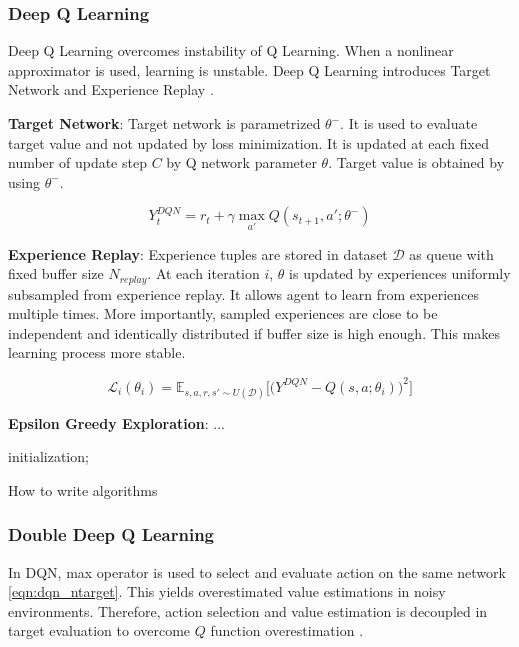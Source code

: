 \subsubsection{Deep Q Learning}

Deep Q Learning overcomes instability of Q Learning. When a nonlinear approximator is used, learning is unstable. Deep Q Learning introduces Target Network and Experience Replay \cite{mnih_human-level_2015}.

\textbf{Target Network}: Target network is parametrized $\theta^-$. It is used to evaluate target value and not updated by loss minimization. It is updated at each fixed number of update step $C$ by Q network parameter $\theta$. Target value is obtained by using $\theta^-$.

\begin{equation}
\label{eqn:dqn_ntarget}
Y_t^{DQN} = r_t + \gamma \max_{a'} Q(s_{t+1},a';\theta^-)
\end{equation}

\textbf{Experience Replay}: Experience tuples are stored in dataset $\mathcal{D}$ as queue with fixed buffer size $N_{replay}$. At each iteration $i$, $\theta$ is updated by experiences uniformly subsampled from experience replay. It allows agent to learn from experiences multiple times. More importantly, sampled experiences are close to be independent and identically distributed if buffer size is high enough. This makes learning process more stable.  

\begin{equation}
\label{eqn:dqn_loss}
\mathcal{L}_i(\theta_i) = \mathbb{E}_{s,a,r,s'\sim U(\mathcal{D})}\Big[\big( Y^{DQN} - Q(s,a;\theta_i) \big) ^ 2 \Big]
\end{equation}

\textbf{Epsilon Greedy Exploration}: ...

\begin{algorithm}[H]
	\SetAlgoLined
	initialization;
	\caption{How to write algorithms}
\end{algorithm}

\subsubsection{Double Deep Q Learning}

In DQN, max operator is used to select and evaluate action on the same network \ref{eqn:dqn_ntarget}. This yields overestimated value estimations in noisy environments. Therefore, action selection and value estimation is decoupled in target evaluation to overcome $Q$ function overestimation \cite{van_hasselt_deep_2015}.

